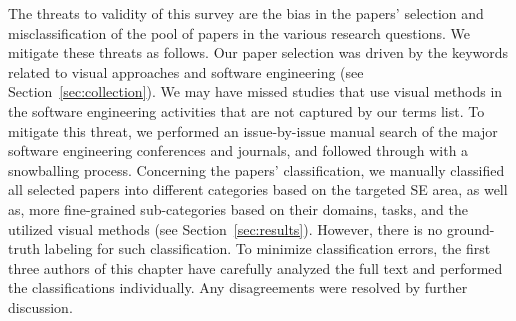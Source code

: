 The threats to validity of this survey are the bias in the papers' selection and misclassification of the pool of papers in the various research questions. We mitigate these threats as follows.
Our paper selection was driven by the keywords related to visual approaches and software engineering (see Section~\ref{sec:collection}). 
We may have missed studies that use visual methods in the software engineering activities that are not captured by our terms list.
To mitigate this threat, we performed an issue-by-issue manual search of the major software engineering conferences and journals, and followed through with a snowballing process.
Concerning the papers' classification, we manually classified all selected papers into different categories based on the targeted SE area, as well as, more fine-grained sub-categories based on their domains, tasks, and the utilized visual methods (see Section~\ref{sec:results}). 
 However, there is no ground-truth labeling for such classification. To minimize classification errors, the first three authors of this chapter have carefully analyzed the full text and performed the classifications individually. Any disagreements were resolved by further discussion.
